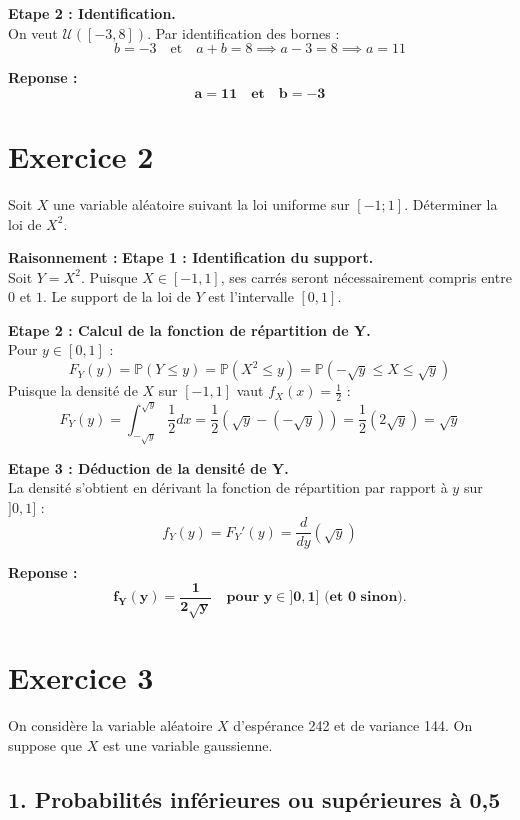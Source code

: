 \documentclass[11pt,a4paper]{article}
\begin{document}
\textbf{Etape 2 : Identification.}\\
On veut $\mathcal{U}([-3, 8])$. Par identification des bornes :
$$ b = -3 \quad \text{et} \quad a+b = 8 \implies a - 3 = 8 \implies a = 11 $$

\textbf{Reponse :}
$$ \mathbf{a = 11 \quad \text{et} \quad b = -3} $$

\hrulefill

\section*{Exercice 2}

Soit $X$ une variable aléatoire suivant la loi uniforme sur $[-1;1]$. Déterminer la loi de $X^2$.

\textbf{Raisonnement :}
\textbf{Etape 1 : Identification du support.}\\
Soit $Y = X^2$. Puisque $X \in [-1, 1]$, ses carrés seront nécessairement compris entre $0$ et $1$. Le support de la loi de $Y$ est l'intervalle $[0, 1]$.

\textbf{Etape 2 : Calcul de la fonction de répartition de Y.}\\
Pour $y \in [0, 1]$ :
$$ F_Y(y) = \mathbb{P}(Y \le y) = \mathbb{P}(X^2 \le y) = \mathbb{P}(-\sqrt{y} \le X \le \sqrt{y}) $$
Puisque la densité de $X$ sur $[-1,1]$ vaut $f_X(x) = \frac{1}{2}$ :
$$ F_Y(y) = \int_{-\sqrt{y}}^{\sqrt{y}} \frac{1}{2} dx = \frac{1}{2} \left( \sqrt{y} - (-\sqrt{y}) \right) = \frac{1}{2} (2\sqrt{y}) = \sqrt{y} $$

\textbf{Etape 3 : Déduction de la densité de Y.}\\
La densité s'obtient en dérivant la fonction de répartition par rapport à $y$ sur $]0, 1]$ :
$$ f_Y(y) = F_Y'(y) = \frac{d}{dy}(\sqrt{y}) $$

\textbf{Reponse :}
$$ \mathbf{f_Y(y) = \frac{1}{2\sqrt{y}} \quad \text{pour } y \in ]0, 1] \text{ (et } 0 \text{ sinon)}.} $$

\hrulefill

\section*{Exercice 3}

On considère la variable aléatoire $X$ d'espérance 242 et de variance 144. On suppose que $X$ est une variable gaussienne.

\subsection*{1. Probabilités inférieures ou supérieures à 0,5}
\end{document}
